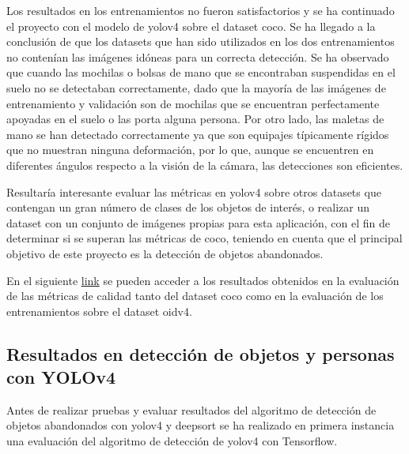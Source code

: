 Los resultados en los entrenamientos no fueron satisfactorios y se ha continuado el proyecto con el modelo de \gls{yolov4} sobre el dataset \gls{coco}. Se ha llegado a la conclusión de que los datasets que han sido utilizados en los dos entrenamientos no contenían las imágenes idóneas para un correcta detección. Se ha observado que cuando las mochilas o bolsas de mano que se encontraban suspendidas en el suelo no se detectaban correctamente, dado que la mayoría de las imágenes de entrenamiento y validación son de mochilas que se encuentran perfectamente apoyadas en el suelo o las porta alguna persona. Por otro lado, las maletas de mano se han detectado correctamente ya que son equipajes típicamente rígidos que no muestran ninguna deformación, por lo que, aunque se encuentren en diferentes ángulos respecto a la visión de la cámara, las detecciones son eficientes.

Resultaría interesante evaluar las métricas en \gls{yolov4} sobre otros datasets que contengan un gran número de clases de los objetos de interés, o realizar un dataset con un conjunto de imágenes propias para esta aplicación, con el fin de determinar si se superan las métricas de \gls{coco}, teniendo en cuenta que el principal objetivo de este proyecto es la detección de objetos abandonados.

En el siguiente \href{https://drive.google.com/drive/folders/1ahdsjoDRICqDNB4dPGVYI6mVtYSDvvgu?usp=sharing}{link} se pueden acceder a los resultados obtenidos en la evaluación de las métricas de calidad tanto del dataset \gls{coco} como en la evaluación de los entrenamientos sobre el dataset \gls{oidv4}.

\subsection{Resultados en detección de objetos y personas con YOLOv4}
\label{subsec:resultados-yolov4-tf}

Antes de realizar pruebas y evaluar resultados del algoritmo de detección de objetos abandonados con \gls{yolov4} y \gls{deepsort} se ha realizado en primera instancia una evaluación del algoritmo de detección de \gls{yolov4} con Tensorflow.

